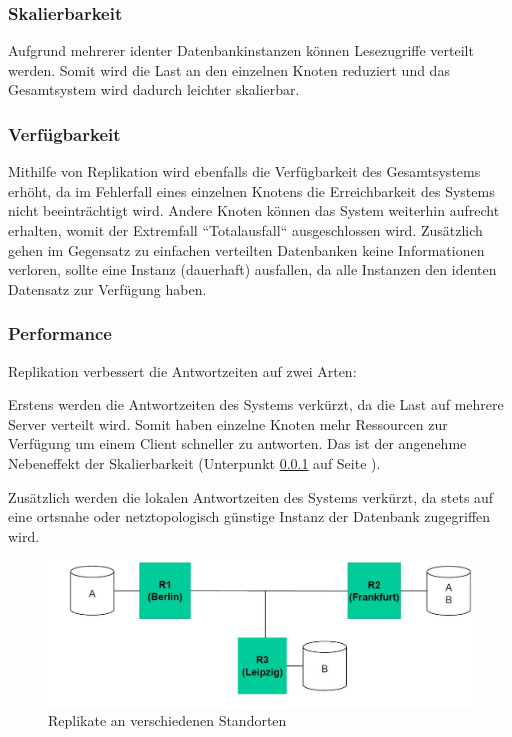 \subsubsection{Skalierbarkeit}
\label{sec:scale}

Aufgrund mehrerer identer Datenbankinstanzen können Lesezugriffe verteilt werden. Somit wird die Last an den einzelnen Knoten reduziert und das Gesamtsystem wird dadurch leichter skalierbar. \cite{kaiserslautern}

\subsubsection{Verfügbarkeit}

Mithilfe von Replikation wird ebenfalls die Verfügbarkeit des Gesamtsystems erhöht, da im Fehlerfall eines einzelnen Knotens die Erreichbarkeit des Systems nicht beeinträchtigt wird. Andere Knoten können das System weiterhin aufrecht erhalten, womit der Extremfall ``Totalausfall`` ausgeschlossen wird. Zusätzlich gehen im Gegensatz zu einfachen verteilten Datenbanken keine Informationen verloren, sollte eine Instanz (dauerhaft) ausfallen, da alle Instanzen den identen Datensatz zur Verfügung haben. \cite{leipzig}

\subsubsection{Performance}

Replikation verbessert die Antwortzeiten auf zwei Arten:

Erstens werden die Antwortzeiten des Systems verkürzt, da die Last auf mehrere Server verteilt wird. Somit haben einzelne Knoten mehr Ressourcen zur Verfügung um einem Client schneller zu antworten. Das ist der angenehme Nebeneffekt der Skalierbarkeit (Unterpunkt \ref{sec:scale} auf Seite \pageref{sec:scale}). \cite{leipzig}

Zusätzlich werden die lokalen Antwortzeiten des Systems verkürzt, da stets auf eine ortsnahe oder netztopologisch günstige Instanz der Datenbank zugegriffen wird. \cite{leipzig}

\begin{figure}[!h]
	\begin{center}
		\includegraphics[width=1\linewidth]{images/ortsverteilung.jpg}
		\caption{Replikate an verschiedenen Standorten \cite{leipzig2}}
		\label{ortsvert}
	\end{center}
\end{figure}

